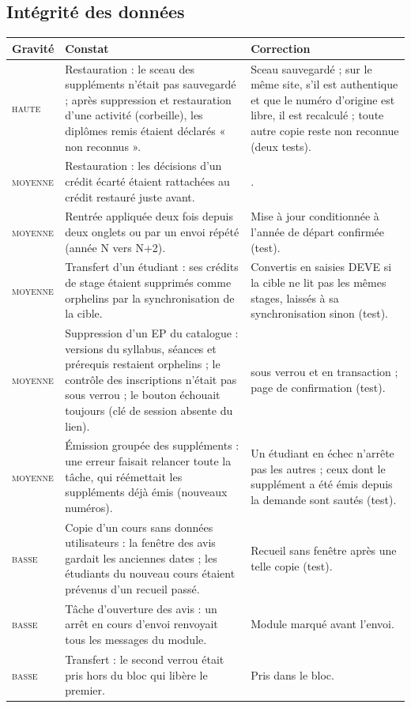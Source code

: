 \documentclass[11pt,a4paper]{article}
\newcommand{\code}[1]{\texttt{\detokenize{#1}}}
\newcommand{\grav}[1]{\textsc{#1}}
\begin{document}
\subsection{Intégrité des données}

\begin{xltabular}{\linewidth}{@{}l X X@{}}
\toprule
\textbf{Gravité} & \textbf{Constat} & \textbf{Correction} \\
\midrule
\endhead
\grav{haute} & Restauration : le sceau des suppléments n'était pas sauvegardé ; après
suppression et restauration d'une activité (corbeille), les diplômes remis étaient déclarés
« non reconnus ». & Sceau sauvegardé ; sur le même site, s'il est authentique et que le numéro
d'origine est libre, il est recalculé ; toute autre copie reste non reconnue (deux tests). \\
\grav{moyenne} & Restauration : les décisions d'un crédit écarté étaient rattachées au crédit
restauré juste avant. & \code{SKIP_ALL_CHILDREN}. \\
\grav{moyenne} & Rentrée appliquée deux fois depuis deux onglets ou par un envoi répété (année
N vers N+2). & Mise à jour conditionnée à l'année de départ confirmée (test). \\
\grav{moyenne} & Transfert d'un étudiant : ses crédits de stage étaient supprimés comme
orphelins par la synchronisation de la cible. & Convertis en saisies DEVE si la cible ne lit pas
les mêmes stages, laissés à sa synchronisation sinon (test). \\
\grav{moyenne} & Suppression d'un EP du catalogue : versions du syllabus, séances et
prérequis restaient orphelins ; le contrôle des inscriptions n'était pas sous verrou ; le bouton
échouait toujours (clé de session absente du lien). & \code{ep_delete_activity()} sous verrou et
en transaction ; page de confirmation (test). \\
\grav{moyenne} & Émission groupée des suppléments : une erreur faisait relancer toute la tâche,
qui réémettait les suppléments déjà émis (nouveaux numéros). & Un étudiant en échec n'arrête pas
les autres ; ceux dont le supplément a été émis depuis la demande sont sautés (test). \\
\grav{basse} & Copie d'un cours sans données utilisateurs : la fenêtre des avis gardait les
anciennes dates ; les étudiants du nouveau cours étaient prévenus d'un recueil passé. & Recueil
sans fenêtre après une telle copie (test). \\
\grav{basse} & Tâche d'ouverture des avis : un arrêt en cours d'envoi renvoyait tous les
messages du module. & Module marqué avant l'envoi. \\
\grav{basse} & Transfert : le second verrou était pris hors du bloc qui libère le premier. &
Pris dans le bloc. \\
\bottomrule
\end{xltabular}
\end{document}
